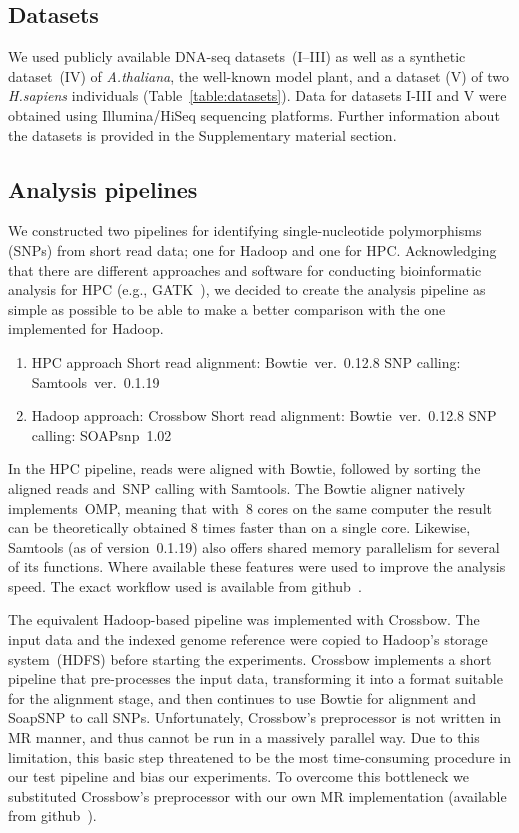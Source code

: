 \documentclass[10pt]{article}
\begin{document}
\subsection*{Datasets}
We used publicly available DNA-seq datasets~(I--III) as well as a synthetic dataset~(IV) of {\it A.thaliana}, the well-known model plant, and a dataset (V) of two {\it H.sapiens} individuals (Table~\ref{table:datasets}). Data for datasets I-III and V were obtained using Illumina/HiSeq sequencing platforms. Further information about the datasets is provided in the Supplementary material section.


\subsection*{Analysis pipelines}
We constructed two pipelines for identifying single-nucleotide polymorphisms (SNPs) from short read data; one for Hadoop and one for HPC.
Acknowledging that there are different approaches and software for conducting bioinformatic analysis for HPC (e.g., GATK~\cite{gatk}), we decided to create the analysis pipeline as simple as possible to be able to make a better comparison with the one implemented for Hadoop.

\begin{enumerate}
\item HPC approach
\subitem Short read alignment: Bowtie~ver.~0.12.8
\subitem SNP calling: Samtools~ver.~0.1.19
\item Hadoop approach: Crossbow
\subitem Short read alignment: Bowtie~ver.~0.12.8
\subitem SNP calling: SOAPsnp~1.02
\end{enumerate}


In the HPC pipeline, reads were aligned with Bowtie, followed by sorting the aligned reads and~SNP calling with Samtools. The Bowtie aligner natively implements~OMP, meaning that with~8 cores on the same computer the result can be theoretically obtained 8 times faster than on a single core. Likewise, Samtools (as of version~0.1.19) also offers shared memory parallelism for several of its functions. Where available these features were used to improve the analysis speed. The exact workflow used is available from github~\cite{code_repo_bash}.

The equivalent Hadoop-based pipeline was implemented with Crossbow. The input data and the indexed genome reference were copied to Hadoop's storage system~(HDFS) before starting the experiments. Crossbow implements a short pipeline that pre-processes the input data, transforming it into a format suitable for the alignment stage, and then continues to use Bowtie for alignment and SoapSNP to call SNPs.  Unfortunately, Crossbow's preprocessor is not written in MR manner, and thus cannot be run in a massively parallel way. Due to this limitation, this basic step threatened to be the most time-consuming procedure in our test pipeline and bias our experiments. To overcome this bottleneck we substituted Crossbow's preprocessor with our own MR implementation (available from github~\cite{code_repo_mr}).
\end{document}
